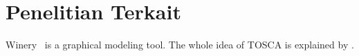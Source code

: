 \section{Penelitian Terkait}
\label{sec:penelitianterkait}

Winery~\cite{Winery} is a graphical modeling tool.
The whole idea of TOSCA is explained by \citet{Binz2009}.

\blindtext[5]
